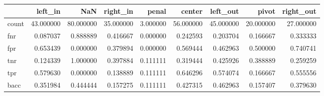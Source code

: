 \begin{tabular}{lrrrrrrrr}
\toprule
{} &    left\_in &        NaN &   right\_in &     penal &     center &   left\_out &      pivot &  right\_out \\
\midrule
count &  43.000000 &  80.000000 &  35.000000 &  3.000000 &  56.000000 &  45.000000 &  20.000000 &  27.000000 \\
fnr   &   0.087037 &   0.888889 &   0.416667 &  0.000000 &   0.242593 &   0.203704 &   0.166667 &   0.333333 \\
fpr   &   0.653439 &   0.000000 &   0.379894 &  0.000000 &   0.569444 &   0.462963 &   0.500000 &   0.740741 \\
tnr   &   0.124339 &   1.000000 &   0.397884 &  0.111111 &   0.319444 &   0.425926 &   0.388889 &   0.259259 \\
tpr   &   0.579630 &   0.000000 &   0.138889 &  0.111111 &   0.646296 &   0.574074 &   0.166667 &   0.555556 \\
bacc  &   0.351984 &   0.444444 &   0.157275 &  0.111111 &   0.427315 &   0.462963 &   0.157407 &   0.379630 \\
\bottomrule
\end{tabular}
